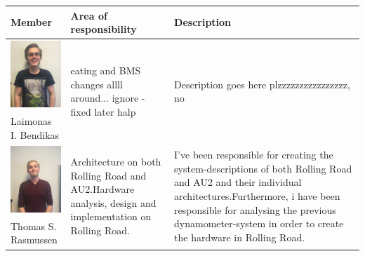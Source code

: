 \newpage
\begin{tabular}[c]{|p{3cm}| p{5cm} | p{6cm}|}
	\hline
	\textbf{Member} & \textbf{Area of responsibility} & \textbf{Description}\\\hline
	
	\phantom{Test}
	\includegraphics[width=3cm]{Introduction/TeamPictures/Laimonas} & \multirow{2}{5cm}{eating and BMS changes allll around... ignore - fixed later halp} & \multirow{2}{6cm}{Description goes here plzzzzzzzzzzzzzzzz, no} \\
	Laimonas I. \newline Bendikas & & \\ \hline
		
	\phantom{Test}
	\includegraphics[width=3cm]{Introduction/TeamPictures/ThomasR} & \multirow{2}{5cm}{Architecture on both Rolling Road and AU2.\newline \newline Hardware analysis, design and implementation on Rolling Road.} & \multirow{2}{6cm}{I've been responsible for creating the system-descriptions of both Rolling Road and AU2 and their individual architectures.\newline \newline Furthermore, i have been responsible for analysing the previous dynamometer-system in order to create the hardware in Rolling Road.} \\
	Thomas S. \newline Rasmussen & & \\ \hline
		

\end{tabular}
